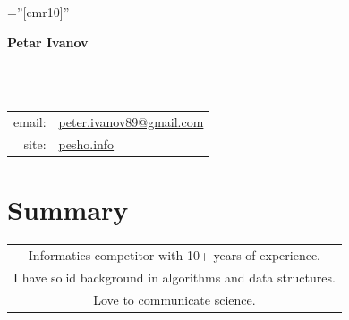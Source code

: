 \documentclass[a4paper,10pt]{article}
\def\name{Petar Ivanov}
\newcommand{\minorcolor}[1]{\textcolor{mygray}{#1}}
\begin{document}
\pagestyle{empty}				%
\font\fb=''[cmr10]''				%

\begin{figure}
	\setlength\fboxsep{0pt}
	\setlength\fboxrule{0.1pt}
        \vspace{-50pt}
\end{figure}

\par{\raggedright\Huge\textbf{\vspace{-3mm}\hspace{0mm}\name}}\\		%
\vspace{-5mm}{\color{linegray}\rule{10.5cm}{0.1mm}}\\

\hspace{4mm}\begin{tabular}{rl}
	\minorcolor{email:} & \href{mailto:peter.ivanov89@gmail.com}{peter.ivanov89@gmail.com}\\
	\minorcolor{site:} & \href{http://pesho.info}{pesho.info}\\
\end{tabular}
\bigskip

\section{Summary}
\begin{center}
  \begin{tabular}{c}
    Informatics competitor with 10+ years of experience.\\
    I have solid background in algorithms and data structures.\\
    Love to communicate science.\\
    \end{tabular}
\end{center}
\end{document}
